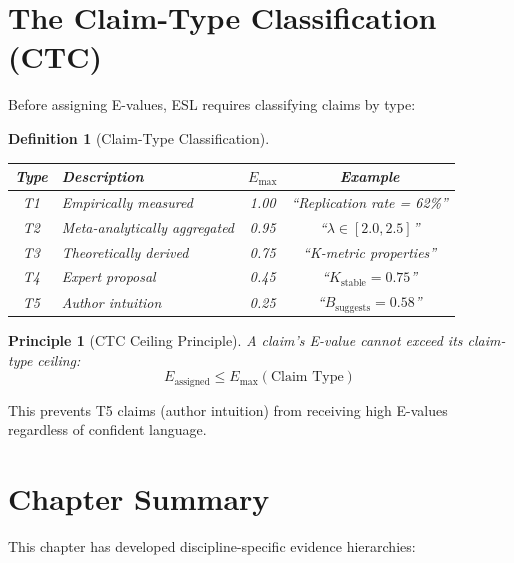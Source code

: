 \documentclass[11pt,a4paper]{article}
\newtheorem{definition}{Definition}[section]
\newtheorem{principle}{Principle}[section]
\theoremstyle{remark}
\begin{document}
\section{The Claim-Type Classification (CTC)}
\label{sec:ctc}

Before assigning E-values, ESL requires classifying claims by type:

\begin{definition}[Claim-Type Classification]
\label{def:ctc}
\begin{center}
\begin{tabular}{clcc}
\toprule
\textbf{Type} & \textbf{Description} & \textbf{$E_{\max}$} & \textbf{Example} \\
\midrule
T1 & Empirically measured & 1.00 & ``Replication rate = 62\%'' \\
T2 & Meta-analytically aggregated & 0.95 & ``$\lambda \in [2.0, 2.5]$'' \\
T3 & Theoretically derived & 0.75 & ``K-metric properties'' \\
T4 & Expert proposal & 0.45 & ``$K_{\text{stable}} = 0.75$'' \\
T5 & Author intuition & 0.25 & ``$B_{\text{suggests}} = 0.58$'' \\
\bottomrule
\end{tabular}
\end{center}
\end{definition}

\begin{principle}[CTC Ceiling Principle]
\label{princ:ctc-ceiling}
A claim's E-value cannot exceed its claim-type ceiling:
\begin{equation}
E_{\text{assigned}} \leq E_{\max}(\text{Claim Type})
\end{equation}
\end{principle}

This prevents T5 claims (author intuition) from receiving high E-values regardless of confident language.


\section{Chapter Summary}
\label{sec:summary}

This chapter has developed discipline-specific evidence hierarchies:
\end{document}
